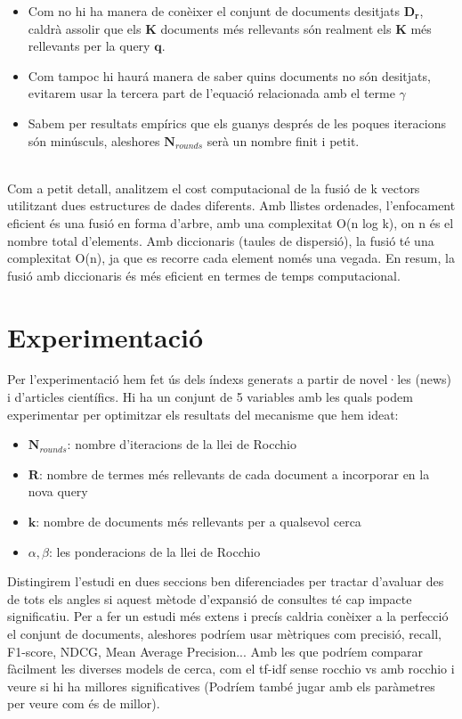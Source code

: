 \documentclass[12pt]{article}
\begin{document}
\begin{itemize}
    \item Com no hi ha manera de conèixer el conjunt de documents desitjats $\mathbf{D_{r}}$, caldrà assolir que els $\mathbf{K}$ documents més rellevants són realment els $\mathbf{K}$ més rellevants per la query $\mathbf{q}$.
    \item Com tampoc hi haurá manera de saber quins documents no són desitjats, evitarem usar la tercera part de l'equació relacionada amb el terme $\gamma$
    \item Sabem per resultats empírics que els guanys després de les poques iteracions són minúsculs, aleshores $\mathbf{N}_{rounds}$ serà un nombre finit i petit.
\end{itemize}
\\ 

Com a petit detall, analitzem el cost computacional de la fusió de k vectors utilitzant dues estructures de dades diferents. Amb llistes ordenades, l'enfocament eficient és una fusió en forma d'arbre, amb una complexitat O(n log k), on n és el nombre total d'elements. Amb diccionaris (taules de dispersió), la fusió té una complexitat O(n), ja que es recorre cada element només una vegada. En resum, la fusió amb diccionaris és més eficient en termes de temps computacional.


\section{Experimentació}

Per l'experimentació hem fet ús dels índexs generats a partir de novel·les (news) i d'articles científics. Hi ha un conjunt de 5 variables amb les quals podem experimentar per optimitzar els resultats del mecanisme que hem ideat: 

\begin{itemize}
    \item $\mathbf{N}_{rounds}$: nombre d'iteracions de la llei de Rocchio
    \item $\mathbf{R}$: nombre de termes més rellevants de cada document a incorporar en la nova query 
    \item $\mathbf{k}$: nombre de documents més rellevants per a qualsevol cerca
    \item $\alpha , \beta$: les ponderacions de la llei de Rocchio 
\end{itemize}

Distingirem l'estudi en dues seccions ben diferenciades per tractar d'avaluar des de tots els angles si aquest mètode d'expansió de consultes té cap impacte significatiu. Per a fer un estudi més extens i precís caldria conèixer a la perfecció el conjunt de documents, aleshores podríem usar mètriques com precisió, recall, F1-score, NDCG, Mean Average Precision... Amb les que podríem comparar fàcilment les diverses models de cerca, com el tf-idf sense rocchio vs amb rocchio i veure si hi ha millores significatives (Podríem també jugar amb els paràmetres per veure com és de millor).
\\ 
\end{document}
